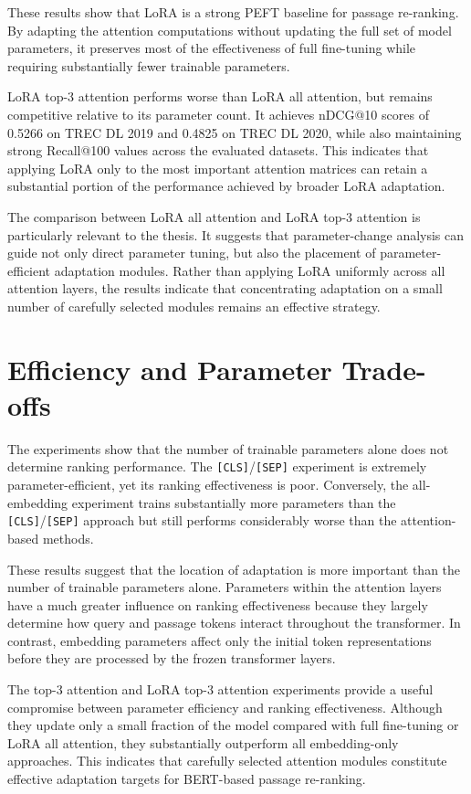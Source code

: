 These results show that LoRA is a strong PEFT baseline for passage re-ranking. By adapting the attention computations without updating the full set of model parameters, it preserves most of the effectiveness of full fine-tuning while requiring substantially fewer trainable parameters.

LoRA top-3 attention performs worse than LoRA all attention, but remains competitive relative to its parameter count. It achieves nDCG@10 scores of 0.5266 on TREC DL 2019 and 0.4825 on TREC DL 2020, while also maintaining strong Recall@100 values across the evaluated datasets. This indicates that applying LoRA only to the most important attention matrices can retain a substantial portion of the performance achieved by broader LoRA adaptation.

The comparison between LoRA all attention and LoRA top-3 attention is particularly relevant to the thesis. It suggests that parameter-change analysis can guide not only direct parameter tuning, but also the placement of parameter-efficient adaptation modules. Rather than applying LoRA uniformly across all attention layers, the results indicate that concentrating adaptation on a small number of carefully selected modules remains an effective strategy.

\section{Efficiency and Parameter Trade-offs}
\label{sec:results_efficiency}

The experiments show that the number of trainable parameters alone does not determine ranking performance. The \texttt{[CLS]}/\texttt{[SEP]} experiment is extremely parameter-efficient, yet its ranking effectiveness is poor. Conversely, the all-embedding experiment trains substantially more parameters than the \texttt{[CLS]}/\texttt{[SEP]} approach but still performs considerably worse than the attention-based methods.

These results suggest that the location of adaptation is more important than the number of trainable parameters alone. Parameters within the attention layers have a much greater influence on ranking effectiveness because they largely determine how query and passage tokens interact throughout the transformer. In contrast, embedding parameters affect only the initial token representations before they are processed by the frozen transformer layers.

The top-3 attention and LoRA top-3 attention experiments provide a useful compromise between parameter efficiency and ranking effectiveness. Although they update only a small fraction of the model compared with full fine-tuning or LoRA all attention, they substantially outperform all embedding-only approaches. This indicates that carefully selected attention modules constitute effective adaptation targets for BERT-based passage re-ranking.

